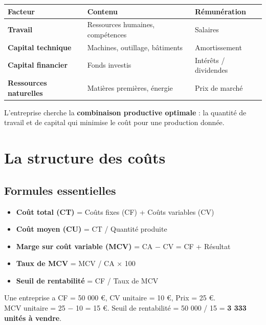 \documentclass[11pt,a4paper]{article}
\begin{document}
\begin{center}
\begin{tabular}{|l|l|l|}
\hline
\textbf{Facteur} & \textbf{Contenu} & \textbf{Rémunération} \\
\hline
\textbf{Travail} & Ressources humaines, compétences & Salaires \\
\textbf{Capital technique} & Machines, outillage, bâtiments & Amortissement \\
\textbf{Capital financier} & Fonds investis & Intérêts / dividendes \\
\textbf{Ressources naturelles} & Matières premières, énergie & Prix de marché \\
\hline
\end{tabular}
\end{center}

\begin{keybox}
L'entreprise cherche la \textbf{combinaison productive optimale} : la quantité de travail et de capital qui minimise le coût pour une production donnée.
\end{keybox}

\section*{La structure des coûts}

\subsection*{Formules essentielles}
\begin{itemize}
  \item \textbf{Coût total (CT)} = Coûts fixes (CF) + Coûts variables (CV)
  \item \textbf{Coût moyen (CU)} = CT / Quantité produite
  \item \textbf{Marge sur coût variable (MCV)} = CA $-$ CV = CF + Résultat
  \item \textbf{Taux de MCV} = MCV / CA × 100
  \item \textbf{Seuil de rentabilité} = CF / Taux de MCV
\end{itemize}

\begin{exbox}
Une entreprise a CF = 50 000 €, CV unitaire = 10 €, Prix = 25 €. \\
MCV unitaire = 25 $-$ 10 = 15 €. Seuil de rentabilité = 50 000 / 15 = \textbf{3 333 unités à vendre}.
\end{exbox}
\end{document}
